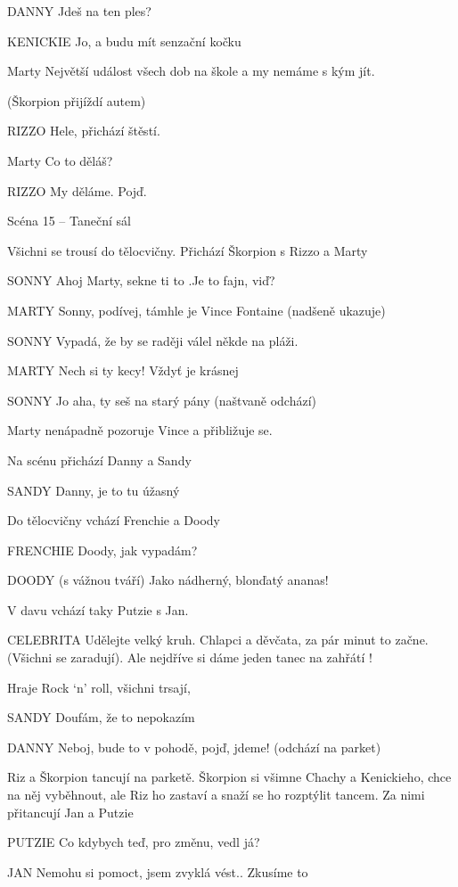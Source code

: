 DANNY        Jdeš na ten ples?

KENICKIE        Jo, a budu mít senzační kočku

Marty        Největší událost všech dob na škole a my nemáme s kým jít.

(Škorpion přijíždí autem)

RIZZO        Hele, přichází štěstí.

Marty        Co to děláš?

RIZZO        My děláme. Pojď.

Scéna 15 – Taneční sál 

Všichni se trousí do tělocvičny. Přichází Škorpion s Rizzo a Marty

SONNY        Ahoj Marty, sekne ti to .Je to fajn, viď? 

MARTY        Sonny, podívej, támhle je Vince Fontaine (nadšeně ukazuje) 

SONNY        Vypadá, že by se raději válel někde na pláži. 

MARTY        Nech si ty kecy! Vždyť je krásnej 

SONNY        Jo aha, ty seš na starý pány (naštvaně odchází) 

Marty nenápadně pozoruje Vince a přibližuje se. 

Na scénu přichází Danny a Sandy 

SANDY        Danny, je to tu úžasný

Do tělocvičny vchází Frenchie a Doody

FRENCHIE        Doody, jak vypadám? 

DOODY        (s vážnou tváří) Jako nádherný, blonďatý ananas! 

V davu vchází taky Putzie s Jan. 

CELEBRITA         Udělejte velký kruh. Chlapci a děvčata, za pár minut to začne.         (Všichni se zaradují). Ale nejdříve si dáme jeden tanec na zahřátí ! 

Hraje Rock ‘n’ roll, všichni trsají,

SANDY        Doufám, že to nepokazím 

DANNY        Neboj, bude to v pohodě, pojď, jdeme! (odchází na parket)

        Riz a Škorpion tancují na parketě. Škorpion si všimne Chachy a Kenickieho, chce na něj vyběhnout, ale Riz ho zastaví a snaží se ho rozptýlit tancem. Za nimi přitancují Jan a Putzie

PUTZIE        Co kdybych teď, pro změnu, vedl já?

JAN        Nemohu si pomoct, jsem zvyklá vést.. Zkusíme to

